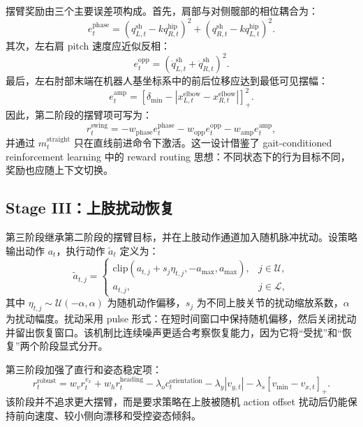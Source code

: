 \documentclass{article}
\newcommand{\relu}[1]{\left[#1\right]_+}
\begin{document}
摆臂奖励由三个主要误差项构成。首先，肩部与对侧髋部的相位耦合为：
\begin{equation}
e_t^{\mathrm{phase}}
=
\left(q_{L,t}^{\mathrm{sh}}-k q_{R,t}^{\mathrm{hip}}\right)^2
+
\left(q_{R,t}^{\mathrm{sh}}-k q_{L,t}^{\mathrm{hip}}\right)^2 .
\end{equation}
其次，左右肩 pitch 速度应近似反相：
\begin{equation}
e_t^{\mathrm{opp}}
=
\left(\dot q_{L,t}^{\mathrm{sh}}+\dot q_{R,t}^{\mathrm{sh}}\right)^2 .
\end{equation}
最后，左右肘部末端在机器人基坐标系中的前后位移应达到最低可见摆幅：
\begin{equation}
e_t^{\mathrm{amp}}
=
\relu{
\delta_{\min}
-
\left|x_{L,t}^{\mathrm{elbow}}-x_{R,t}^{\mathrm{elbow}}\right|
}^2 .
\end{equation}
因此，第二阶段的摆臂项可写为：
\begin{equation}
r_t^{\mathrm{swing}}
=
-w_{\mathrm{phase}}e_t^{\mathrm{phase}}
-w_{\mathrm{opp}}e_t^{\mathrm{opp}}
-w_{\mathrm{amp}}e_t^{\mathrm{amp}},
\end{equation}
并通过 $m_t^{\mathrm{straight}}$ 只在直线前进命令下激活。这一设计借鉴了 gait-conditioned reinforcement learning 中的 reward routing 思想：不同状态下的行为目标不同，奖励也应随上下文切换。

\subsection{Stage III：上肢扰动恢复}

第三阶段继承第二阶段的摆臂目标，并在上肢动作通道加入随机脉冲扰动。设策略输出动作 $a_t$，执行动作 $\tilde a_t$ 定义为：
\begin{equation}
\tilde a_{t,j}=
\begin{cases}
\mathrm{clip}(a_{t,j}+s_j\eta_{t,j},-a_{\max},a_{\max}), & j\in\mathcal{U},\\
a_{t,j}, & j\in\mathcal{L},
\end{cases}
\end{equation}
其中 $\eta_{t,j}\sim\mathcal{U}(-\alpha,\alpha)$ 为随机动作偏移，$s_j$ 为不同上肢关节的扰动缩放系数，$\alpha$ 为扰动幅度。扰动采用 pulse 形式：在短时间窗口中保持随机偏移，然后关闭扰动并留出恢复窗口。该机制比连续噪声更适合考察恢复能力，因为它将“受扰”和“恢复”两个阶段显式分开。

第三阶段加强了直行和姿态稳定项：
\begin{equation}
r_t^{\mathrm{robust}}
=
w_v r_t^{v_x}
+ w_h r_t^{\mathrm{heading}}
-\lambda_o c_t^{\mathrm{orientation}}
-\lambda_y |v_{y,t}|
-\lambda_s \relu{v_{\min}-v_{x,t}} .
\end{equation}
该阶段并不追求更大摆臂，而是要求策略在上肢被随机 action offset 扰动后仍能保持前向速度、较小侧向漂移和受控姿态倾斜。
\end{document}
